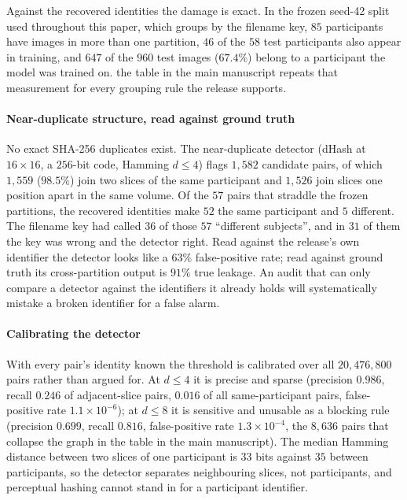 \documentclass[11pt]{article}
\begin{document}
Against the recovered identities the damage is exact. In the frozen
seed-42 split used throughout this paper, which groups by the
filename key, $85$ participants have images in more than one
partition, $46$ of the $58$ test participants also appear in
training, and $647$ of the $960$ test images ($67.4\%$) belong to a
participant the model was trained on. the table in the main manuscript
repeats that measurement for every grouping rule the release
supports.



\paragraph{Near-duplicate structure, read against ground truth}
No exact SHA-256 duplicates exist. The near-duplicate detector (dHash
at $16 \times 16$, a $256$-bit code, Hamming $d \leq 4$) flags
$1{,}582$ candidate pairs, of which $1{,}559$ ($98.5\%$) join two
slices of the same participant and $1{,}526$ join slices one position
apart in the same volume. Of the $57$ pairs that straddle the frozen partitions, the recovered
identities make $52$ the same participant and $5$ different. The filename key
had called $36$ of those $57$ ``different subjects'', and in $31$ of them the
key was wrong and the detector right. Read against the release's own identifier
the detector looks like a $63\%$ false-positive rate; read against ground truth
its cross-partition output is $91\%$ true leakage. An audit that can only
compare a detector against the identifiers it already holds will systematically
mistake a broken identifier for a false alarm.

\paragraph{Calibrating the detector}
With every pair's identity known the threshold is calibrated over all
$20{,}476{,}800$ pairs rather than argued for. At $d \leq 4$ it is precise and
sparse (precision $0.986$, recall $0.246$ of adjacent-slice pairs, $0.016$ of
all same-participant pairs, false-positive rate $1.1 \times 10^{-6}$); at
$d \leq 8$ it is sensitive and unusable as a blocking rule (precision $0.699$,
recall $0.816$, false-positive rate $1.3 \times 10^{-4}$, the $8{,}636$ pairs
that collapse the graph in the table in the main manuscript). The median Hamming
distance between two slices of one participant is $33$ bits against $35$
between participants, so the detector separates neighbouring slices, not
participants, and perceptual hashing cannot stand in for a participant
identifier.
\end{document}
